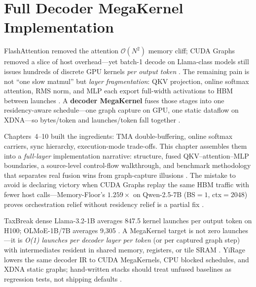 \chapter{Full Decoder MegaKernel Implementation}
\label{chap:ch11}

FlashAttention removed the attention $\mathcal{O}(N^2)$ memory cliff; CUDA Graphs removed a slice of host overhead---yet batch-1 decode on Llama-class models still issues hundreds of discrete GPU kernels \emph{per output token} \citep{taxbreak2026,memoryfloor2026,dao2022flashattention}. The remaining pain is not ``one slow matmul'' but \emph{layer fragmentation}: QKV projection, online softmax attention, RMS norm, and MLP each export full-width activations to HBM between launches \citep{nvidia2024cudagraphs,kwon2023vllm}. A \textbf{decoder MegaKernel} fuses those stages into one residency-aware schedule---one graph capture on GPU, one static dataflow on XDNA---so bytes/token and launches/token fall together \citep{chen2020compilerbasedhardw,yirage2026}.

Chapters~4--10 built the ingredients: TMA double-buffering, online softmax carriers, sync hierarchy, execution-mode trade-offs. This chapter assembles them into a \emph{full-layer} implementation narrative: structure, fused QKV--attention--MLP boundaries, a source-level control-flow walkthrough, and benchmark methodology that separates real fusion wins from graph-capture illusions \citep{semianalysis2024tma,amd2024xdna,patel2025llminference}. The mistake to avoid is declaring victory when CUDA Graphs replay the same HBM traffic with fewer host calls---Memory-Floor's $1.259\times$ on Qwen-2.5-7B (BS${=}1$, ctx${=}2048$) proves orchestration relief without residency relief is a partial fix \citep{memoryfloor2026}.

TaxBreak dense Llama-3.2-1B averages 847.5 kernel launches per output token on H100; OLMoE-1B/7B averages 9,305 \citep{taxbreak2026}. A MegaKernel target is not zero launches---it is \emph{O(1) launches per decoder layer per token} (or per captured graph step) with intermediates resident in shared memory, registers, or tile SRAM \citep{nvidia2022hopper,amd2024aie}. YiRage lowers the same decoder IR to CUDA MegaKernels, CPU blocked schedules, and XDNA static graphs; hand-written stacks should treat unfused baselines as regression tests, not shipping defaults \citep{yirage2026,liu2024deepseekv3}.

